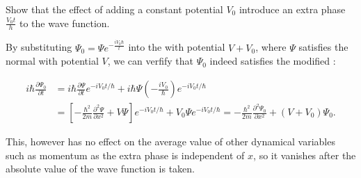\documentclass[a4paper,12pt]{report}
\begin{document}
{Show that the effect of adding a constant potential \(V_0\) introduce an extra phase \(\displaystyle \frac{V_0t}{h}\) to the wave function.}
{By substituting \(\displaystyle \Psi_0 = \Psi e^{-\frac{iV_0\hbar}{t}}\) into the \screq with potential \(V + V_0\), where \(\Psi\) satisfies the normal \screq with potential \(V\), we can verfify that \(\Psi_0\) indeed satisfies the modified \screq: 
			
\begin{equation}
	\begin{aligned}
		i \hbar \frac{\partial \Psi_0}{\partial t} & =i \hbar \frac{\partial \Psi}{\partial t} e^{-i V_0 t / \hbar}+i \hbar \Psi\left(-\frac{i V_0}{\hbar}\right) e^{-i V_0 t / \hbar} \\ &=\left[-\frac{\hbar^2}{2 m} \frac{\partial^2 \Psi}{\partial x^2}+V \Psi\right] e^{-i V_0 t / \hbar}+V_0 \Psi e^{-i V_0 t / \hbar} =-\frac{\hbar^2}{2 m} \frac{\partial^2 \Psi_0}{\partial x^2}+\left(V+V_0\right) \Psi_0 .
	\end{aligned}
\end{equation}
		
This, however has no effect on the average value of other dynamical variables such as momentum as the extra phase is independent of \(x\), so it vanishes after the absolute value of the wave function is taken.}
		
\end{document}
